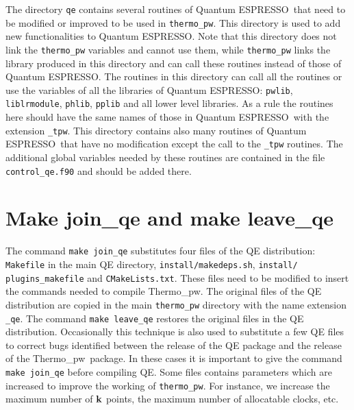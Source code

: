 \documentclass[12pt,a4paper,twoside]{report}
\def\qe{{\sc Quantum ESPRESSO}}
\def\tpw{{\sc Thermo}\_{\sc pw}}
\begin{document}
The directory \texttt{qe} contains several routines of \qe\ that need to
be modified or improved to be used in \texttt{thermo\_pw}. This
directory is used to add new functionalities to \qe. Note that this directory
does not link the \texttt{thermo\_pw} variables and cannot use them, while
\texttt{thermo\_pw} links the library produced in this directory and can
call these routines instead of those of \qe. The routines in this directory
can call all the routines or use the variables of all the libraries
of \qe: \texttt{pwlib}, \texttt{liblrmodule},
\texttt{phlib}, \texttt{pplib} and all lower level libraries.
As a rule the routines here should have the same names of those in \qe\ with
the extension \texttt{\_tpw}. This directory contains also many routines
of \qe\ that have no modification except the call to the \texttt{\_tpw}
routines. The additional global variables needed by these routines are
contained in the file \texttt{control\_qe.f90} and should be added there.

\newpage
{\color{dark-blue}\chapter{Make join\_qe and make leave\_qe}}
\color{black}

The command \texttt{make join\_qe} substitutes four files of the QE
distribution: \texttt{Makefile} in the main QE directory, 
\texttt{install/makedeps.sh}, \texttt{install/}
\texttt{plugins\_makefile} and \texttt{CMakeLists.txt}. 
These files need to be modified to insert the commands needed to
compile \tpw. The original files of the QE distribution are copied
in the main \texttt{thermo\_pw} directory with the name extension
\texttt{\_qe}. The command \texttt{make leave\_qe} restores the original
files in the QE distribution.
Occasionally this technique is also used to substitute a few QE files
to correct bugs identified between the release of the QE package 
and the release of the \tpw\ package. In these cases it is important
to give the command \texttt{make join\_qe} before compiling QE.
Some files contains parameters which are increased to improve the 
working of \texttt{thermo\_pw}. For instance, we increase the maximum 
number of ${\bf k}$ points, the maximum number of allocatable clocks, etc.
\end{document}
